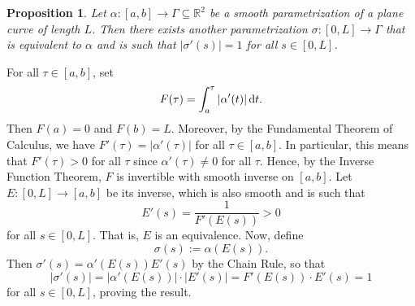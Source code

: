 \documentclass[10pt]{article}
\makeatletter
\newcommand{\R}{\mathbb{R}}
\theoremstyle{newstyle}
\newtheorem{prop}[thm]{Proposition}
\newenvironment{pf}[1][\proofname]{\par
  \pushQED{\qed}%
  \normalfont \topsep0\p@\relax
  \trivlist
  \item[\hskip\labelsep\scshape
  #1\@addpunct{.}]\ignorespaces
}{%
  \popQED\endtrivlist\@endpefalse
}
\makeatother
\begin{document}
\begin{prop}
Let $\alpha : [a, b] \to \Gamma \subseteq \R^2$ be a smooth parametrization of a plane curve of 
length $L$. Then there exists another parametrization $\sigma : [0, L] \to \Gamma$ that is 
equivalent to $\alpha$ and is such that $|\sigma'(s)| = 1$ for all $s \in [0, L]$.

\begin{center}
\end{center}
\end{prop}
\begin{pf}
For all $\tau \in [a, b]$, set 
\[ F(\tau) = \int_a^\tau |\alpha'(t)|\,{\rm d}t. \]
Then $F(a) = 0$ and $F(b) = L$. Moreover, by the Fundamental Theorem of Calculus, we have 
$F'(\tau) = |\alpha'(\tau)|$ for all $\tau \in [a, b]$. In particular, 
this means that $F'(\tau) > 0$ for all $\tau$ since $\alpha'(\tau) \neq 0$ for all $\tau$. 
Hence, by the Inverse Function Theorem, $F$ is invertible with smooth inverse on $[a, b]$. 
Let $E : [0, L] \to [a, b]$ be its inverse, which is also smooth and is such that 
\[ E'(s) = \frac{1}{F'(E(s))} > 0 \]
for all $s \in [0, L]$. That is, $E$ is an equivalence. Now, define 
\[ \sigma(s) := \alpha(E(s)). \]
Then $\sigma'(s) = \alpha'(E(s)) E'(s)$ by the Chain Rule, so that 
\[ |\sigma'(s)| = |\alpha'(E(s))| \cdot |E'(s)| = F'(E(s)) \cdot E'(s) = 1 \]
for all $s \in [0, L]$, proving the result.
\end{pf}
\end{document}
